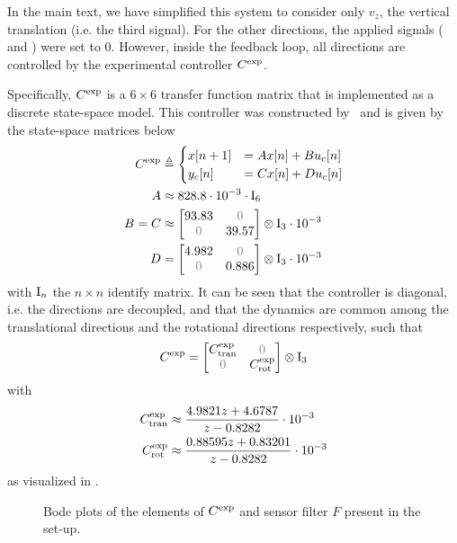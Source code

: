 In the main text, we have simplified this system to consider only $v_z$, the vertical translation (i.e. the third signal).
For the other directions, the applied signals ( and ) were set to $0$.
However, inside the feedback loop, all directions are controlled by the experimental controller $C^{\mathrm{exp}}$.

Specifically, $C^{\mathrm{exp}}$ is a $6\times6$ transfer function matrix that is implemented as a discrete state-space model.
This controller was constructed by~\citet{Rademakers2005MSc}
 and is given by the state-space matrices below
\begin{align}
  \experimental\Controller & \isdef 
  \begin{cases}
     x[n+1] &= A x[n] + B u_c[n]\\
       y_c[n]   &= C x[n] + D u_c[n] 
  \end{cases}\\
  A       &\approx 828.8 \cdot 10^{-3} \cdot \Identity{6} \\
  B = C &\approx \AvisMatrixDiagonal{93.83}{39.57} \cdot 10^{-3}\\
  D       &= \AvisMatrixDiagonal{4.982}{0.886} \cdot 10^{-3}
\end{align}
with $\mathrm{I}_{n}$ the $n\times n$ identify matrix.
It can be seen that the controller is diagonal, i.e. the directions are decoupled, and that the dynamics are common among the translational directions and the rotational directions respectively, such that
\begin{equation}
  \experimental\Controller = 
  \AvisMatrixDiagonal{\experimental\Controller_{\mathrm{tran}}}{\experimental\Controller_{\mathrm{rot}}}
\end{equation}
with
\begin{align}
C^{\mathrm{exp}}_{\mathrm{tran}} &  \approx 
   \frac{4.9821 z + 4.6787}{ z - 0.8282} \cdot 10^{-3} \\
  C^{\mathrm{exp}}_{\mathrm{rot}} & \approx 
    \frac{0.88595 z + 0.83201}{ z - 0.8282} \cdot 10^{-3}
\end{align}
 as visualized in .

\begin{figure}[p]
\setlength{}
\setlength\figureheight{0.68\figurewidth}

\caption[ controller and filters]{Bode plots of the elements of $C^{\mathrm{exp}}$ and sensor filter $F$ present in the set-up.}
\label{fig:avis:bodeplots:controllerAndSensor}
\end{figure}

